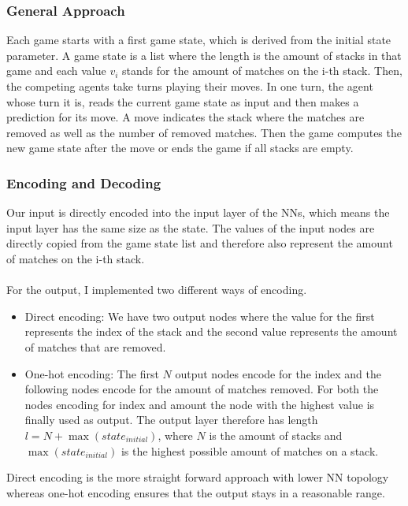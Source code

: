 \documentclass[11pt]{report}
\begin{document}
\begin{enumerate}
                \subsubsection{General Approach}
    Each game starts with a first game state, which is derived from the initial state parameter.
    A game state is a list where the length is the amount of stacks in that game and each value $v_i$ stands for the amount of matches on the i-th stack.
    Then, the competing agents take turns playing their moves.
    In one turn, the agent whose turn it is, reads the current game state as input and then makes a prediction for its move.
    A move indicates the stack where the matches are removed as well as the number of removed matches.
    Then the game computes the new game state after the move or ends the game if all stacks are empty.

                \subsubsection{Encoding and Decoding}
    Our input is directly encoded into the input layer of the NNs, which means the input layer has the same size as the state.
    The values of the input nodes are directly copied from the game state list and therefore also represent the amount of matches on the i-th stack.
    \\ \\
    For the output, I implemented two different ways of encoding.
    \begin{itemize}
        \item Direct encoding: We have two output nodes where the value for the first represents the index of the stack and the second value represents the amount of matches that are removed.
        \item One-hot encoding: The first $N$ output nodes encode for the index and the following nodes encode for the amount of matches removed.
        For both the nodes encoding for index and amount the node with the highest value is finally used as output.
        The output layer therefore has length $l = N + \max(state_{initial})$, where $N$ is the amount of stacks and $\max(state_{initial})$ is the highest possible amount of matches on a stack.
    \end{itemize}
    Direct encoding is the more straight forward approach with lower NN topology whereas one-hot encoding ensures that the output stays in a reasonable range.

\end{enumerate}
\end{document}
